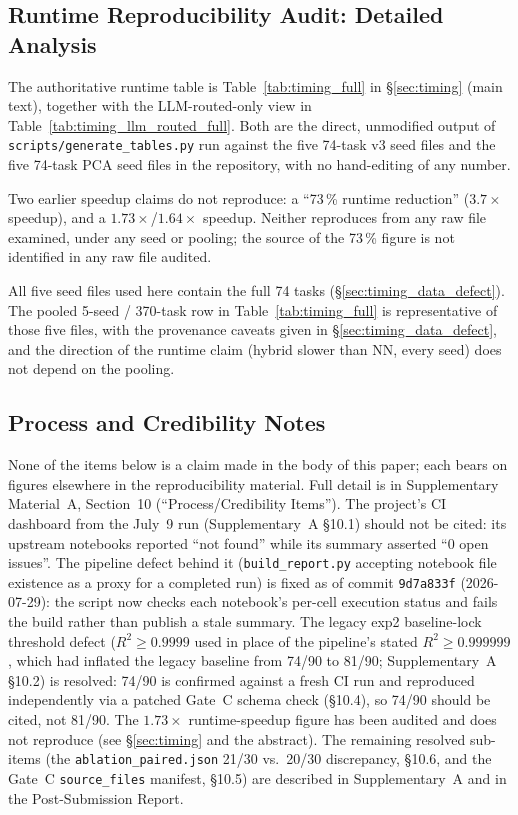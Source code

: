 \documentclass[twoside,11pt]{article}
\begin{document}
\subsection{Runtime Reproducibility Audit: Detailed Analysis}
The authoritative runtime table is Table~\ref{tab:timing_full} in \S\ref{sec:timing}
(main text), together with the LLM-routed-only view in
Table~\ref{tab:timing_llm_routed_full}. Both are the direct, unmodified output of
\texttt{scripts/generate\_tables.py} run against the five 74-task v3 seed files and the
five 74-task PCA seed files in the repository, with no hand-editing of any number.

Two earlier speedup claims do not reproduce: a ``73\,\% runtime reduction''
($3.7\times$ speedup), and a $1.73\times$/$1.64\times$ speedup. Neither reproduces from
any raw file examined, under any seed or pooling; the source of the 73\,\% figure is
not identified in any raw file audited.

All five seed files used here contain the full 74 tasks (\S\ref{sec:timing_data_defect}). The pooled 5-seed / 370-task row in
Table~\ref{tab:timing_full} is representative of those five files, with the
provenance caveats given in \S\ref{sec:timing_data_defect}, and the
direction of the runtime claim (hybrid slower than NN, every seed) does not
depend on the pooling.

\subsection{Process and Credibility Notes}
None of the items below is a claim made in the body of this paper; each bears on figures
elsewhere in the reproducibility material. Full detail is in Supplementary Material~A,
Section~10 (``Process/Credibility Items''). The project's CI dashboard from the July~9 run
(Supplementary~A \S10.1) should not be cited: its upstream notebooks reported ``not found''
while its summary asserted ``0 open issues''. The pipeline defect behind it
(\texttt{build\_report.py} accepting notebook file existence as a proxy for a completed run)
is fixed as of commit \texttt{9d7a833f} (2026-07-29): the script now checks each notebook's
per-cell execution status and fails the build rather than publish a stale summary. The legacy
exp2 baseline-lock threshold defect ($R^2 \geq 0.9999$ used in place of the pipeline's stated
$R^2 \geq 0.999999$, which had inflated the legacy baseline from 74/90 to 81/90;
Supplementary~A \S10.2) is resolved: 74/90 is confirmed against a fresh CI run and reproduced
independently via a patched Gate~C schema check (\S10.4), so 74/90 should be cited, not 81/90.
The $1.73\times$ runtime-speedup figure has been audited and does not reproduce (see
\S\ref{sec:timing} and the abstract). The remaining resolved sub-items (the
\texttt{ablation\_paired.json} 21/30 vs.\ 20/30 discrepancy, \S10.6, and the Gate~C
\texttt{source\_files} manifest, \S10.5) are described in Supplementary~A and in the
Post-Submission Report.



\end{document}
